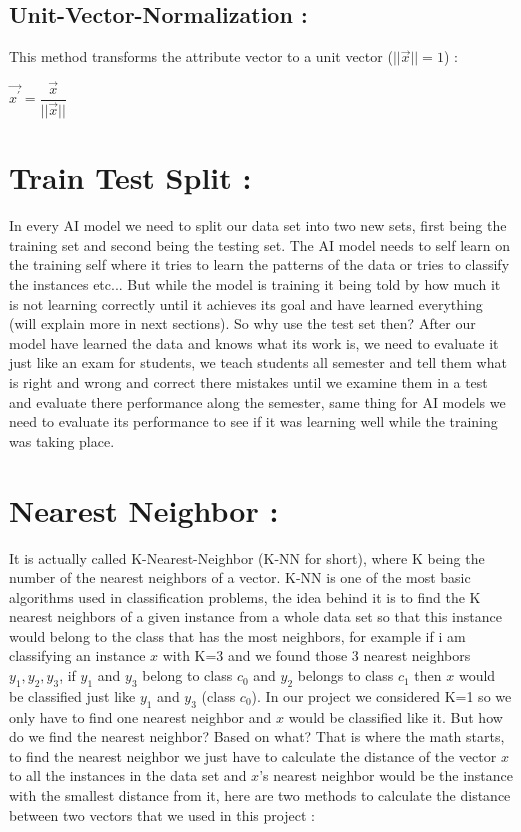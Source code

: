 \documentclass[10pt,a4paper]{article}
\begin{document}
\subsection{Unit-Vector-Normalization :}
This method transforms the attribute vector to a unit vector ($ ||\vec{x}|| = 1 $) :\\
\begin{center}
$ \vec{x^{\prime}} = \dfrac{\vec{x}}{||\vec{x}||} $
\end{center}

\section{Train Test Split :}
In every AI model we need to split our data set into two new sets, first being the training set and second being the testing set. The AI model needs to self learn on the training self where it tries to learn the patterns of the data or tries to classify the instances etc... But while the model is training it being told by how much it is not learning correctly until it achieves its goal and have learned everything (will explain more in next sections). So why use the test set then? After our model have learned the data and knows what its work is, we need to evaluate it just like an exam for students, we teach students all semester and tell them what is right and wrong and correct there mistakes until we examine them in a test and evaluate there performance along the semester, same thing for AI models we need to evaluate its performance to see if it was learning well while the training was taking place.

\section{Nearest Neighbor :}
\large It is actually called K-Nearest-Neighbor (K-NN for short), where K being the number of the nearest neighbors of a vector. K-NN is one of the most basic algorithms used in classification problems, the idea behind it is to find the K nearest neighbors of a given instance from a whole data set so that this instance would belong to the class that has the most neighbors, for example if i am classifying an instance $ x $ with K=3 and we found those 3 nearest neighbors $ y_1,y_2,y_3 $, if $ y_1 $ and $ y_3 $ belong to class $ c_0 $ and $ y_2 $ belongs to class $ c_1 $ then $ x $ would be classified just like $ y_1 $ and $ y_3 $ (class $ c_0 $). In our project we considered K=1 so we only have to find one nearest neighbor and $ x $ would be classified like it. But how do we find the nearest neighbor? Based on what? That is where the math starts, to find the nearest neighbor we just have to calculate the distance of the vector $ x $ to all the instances in the data set and $ x $'s nearest neighbor would be the instance with the smallest distance from it, here are two methods to calculate the distance between two vectors that we used in this project :\\
\end{document}
